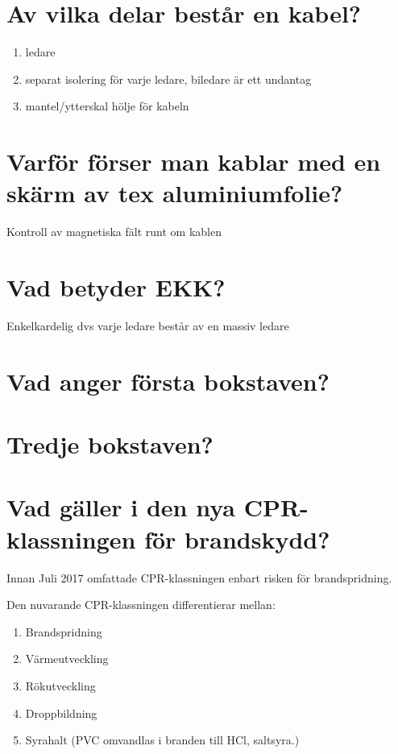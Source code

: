 \documentclass[a4paper,swedish]{article}
\begin{document}
\setcounter{section}{10}
\section{Av vilka delar består en kabel?}

\begin{enumerate}
\item ledare
\item separat isolering för varje ledare, biledare är ett undantag
\item mantel/ytterskal hölje för kabeln
\end{enumerate}

\setcounter{section}{12}
\section{Varför förser man kablar med en skärm av tex aluminiumfolie?}

Kontroll av magnetiska fält runt om kablen

\setcounter{section}{14}
\section{Vad betyder EKK?}

Enkelkardelig dvs varje ledare består av en massiv ledare

\setcounter{section}{16}
\section{Vad anger första bokstaven?}

\setcounter{section}{18}
\section{Tredje bokstaven?}

\setcounter{section}{20}
\section{Vad gäller i den nya CPR-klassningen för brandskydd?}

Innan Juli 2017 omfattade CPR-klassningen enbart risken för brandspridning.

Den nuvarande CPR-klassningen differentierar mellan:

\begin{center}
  \begin{enumerate}
  \item Brandspridning
  \item Värmeutveckling
  \item Rökutveckling
  \item Droppbildning
  \item Syrahalt (PVC omvandlas i branden till HCl, saltsyra.)
  \end{enumerate}
\end{center}
\end{document}
